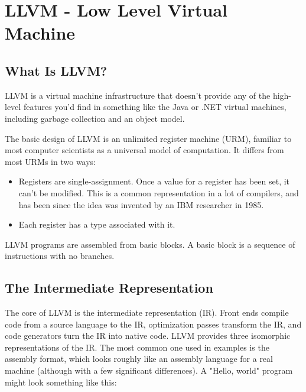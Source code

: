 \documentclass[a4paper,10pt]{book}
\begin{document}
\chapter{LLVM - Low Level Virtual Machine}

\section{What Is LLVM?}
LLVM is a virtual machine infrastructure that doesn’t provide any of the high-level features you’d find in something like the Java or .NET virtual machines, including garbage collection and an object model.

The basic design of LLVM is an unlimited register machine (URM), familiar to most computer scientists as a universal model of computation. It differs from most URMs in two ways:

\begin{itemize}
\item Registers are single-assignment. Once a value for a register has been set, it can’t be modified. This is a common representation in a lot of compilers, and has been since the idea was invented by an IBM researcher in 1985.
\item Each register has a type associated with it.
\end{itemize}

LLVM programs are assembled from basic blocks. A basic block is a sequence of instructions with no branches.

\section{The Intermediate Representation}

The core of LLVM is the intermediate representation (IR). Front ends compile code from a source language to the IR, optimization passes transform the IR, and code generators turn the IR into native code.
LLVM provides three isomorphic representations of the IR. The most common one used in examples is the assembly format, which looks roughly like an assembly language for a real machine (although with a few significant differences). A "Hello, world" program might look something like this:
\end{document}
